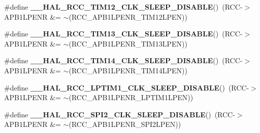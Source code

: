 \begin{DoxyCompactItemize}
\item 
\mbox{\label{group___r_c_c_ex___peripheral___clock___sleep___enable___disable_ga505a2a0607d8b7993e365d169aa9b53a}} 
\#define {\bfseries \+\_\+\+\_\+\+H\+A\+L\+\_\+\+R\+C\+C\+\_\+\+T\+I\+M12\+\_\+\+C\+L\+K\+\_\+\+S\+L\+E\+E\+P\+\_\+\+D\+I\+S\+A\+B\+LE}()~(R\+CC-\/$>$A\+P\+B1\+L\+P\+E\+NR \&= $\sim$(R\+C\+C\+\_\+\+A\+P\+B1\+L\+P\+E\+N\+R\+\_\+\+T\+I\+M12\+L\+P\+EN))
\item 
\mbox{\label{group___r_c_c_ex___peripheral___clock___sleep___enable___disable_ga329e7011f85631cd41cfaa2dc7467934}} 
\#define {\bfseries \+\_\+\+\_\+\+H\+A\+L\+\_\+\+R\+C\+C\+\_\+\+T\+I\+M13\+\_\+\+C\+L\+K\+\_\+\+S\+L\+E\+E\+P\+\_\+\+D\+I\+S\+A\+B\+LE}()~(R\+CC-\/$>$A\+P\+B1\+L\+P\+E\+NR \&= $\sim$(R\+C\+C\+\_\+\+A\+P\+B1\+L\+P\+E\+N\+R\+\_\+\+T\+I\+M13\+L\+P\+EN))
\item 
\mbox{\label{group___r_c_c_ex___peripheral___clock___sleep___enable___disable_ga7f7d650bc39949c0612a553fecd46fa7}} 
\#define {\bfseries \+\_\+\+\_\+\+H\+A\+L\+\_\+\+R\+C\+C\+\_\+\+T\+I\+M14\+\_\+\+C\+L\+K\+\_\+\+S\+L\+E\+E\+P\+\_\+\+D\+I\+S\+A\+B\+LE}()~(R\+CC-\/$>$A\+P\+B1\+L\+P\+E\+NR \&= $\sim$(R\+C\+C\+\_\+\+A\+P\+B1\+L\+P\+E\+N\+R\+\_\+\+T\+I\+M14\+L\+P\+EN))
\item 
\mbox{\label{group___r_c_c_ex___peripheral___clock___sleep___enable___disable_ga5f05fa1cd35c33e8c10ee13eca75e304}} 
\#define {\bfseries \+\_\+\+\_\+\+H\+A\+L\+\_\+\+R\+C\+C\+\_\+\+L\+P\+T\+I\+M1\+\_\+\+C\+L\+K\+\_\+\+S\+L\+E\+E\+P\+\_\+\+D\+I\+S\+A\+B\+LE}()~(R\+CC-\/$>$A\+P\+B1\+L\+P\+E\+NR \&= $\sim$(R\+C\+C\+\_\+\+A\+P\+B1\+L\+P\+E\+N\+R\+\_\+\+L\+P\+T\+I\+M1\+L\+P\+EN))
\item 
\mbox{\label{group___r_c_c_ex___peripheral___clock___sleep___enable___disable_ga4fff9b3416d2940cac20962e6d5655ec}} 
\#define {\bfseries \+\_\+\+\_\+\+H\+A\+L\+\_\+\+R\+C\+C\+\_\+\+S\+P\+I2\+\_\+\+C\+L\+K\+\_\+\+S\+L\+E\+E\+P\+\_\+\+D\+I\+S\+A\+B\+LE}()~(R\+CC-\/$>$A\+P\+B1\+L\+P\+E\+NR \&= $\sim$(R\+C\+C\+\_\+\+A\+P\+B1\+L\+P\+E\+N\+R\+\_\+\+S\+P\+I2\+L\+P\+EN))

\end{DoxyCompactItemize}

